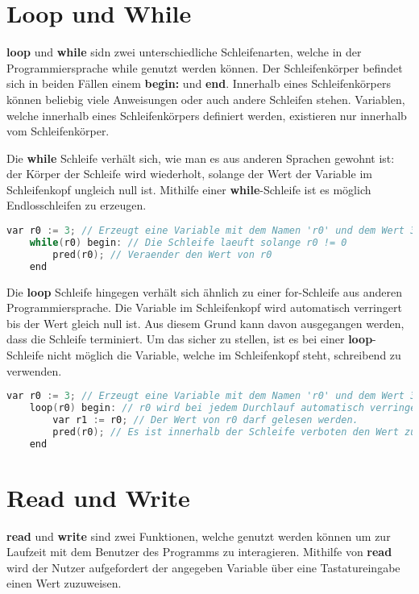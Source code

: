 \section{Loop und While}
\textbf{loop} und \textbf{while} sidn zwei unterschiedliche Schleifenarten, welche in der Programmiersprache while genutzt werden können. Der Schleifenkörper befindet sich in beiden Fällen einem \textbf{begin:} und \textbf{end}. Innerhalb eines Schleifenkörpers können beliebig viele Anweisungen oder auch andere Schleifen stehen. Variablen, welche innerhalb eines Schleifenkörpers definiert werden, existieren nur innerhalb vom Schleifenkörper.

Die \textbf{while} Schleife verhält sich, wie man es aus anderen Sprachen gewohnt ist: der Körper der Schleife wird wiederholt, solange der Wert der Variable im Schleifenkopf ungleich null ist. Mithilfe einer \textbf{while}-Schleife ist es möglich Endlosschleifen zu erzeugen.

\begin{lstlisting}[language=c, caption=while-Schleife in While, label={lst:while-var-defdec}]
	var r0 := 3; // Erzeugt eine Variable mit dem Namen 'r0' und dem Wert 3
	while(r0) begin: // Die Schleife laeuft solange r0 != 0
		pred(r0); // Veraender den Wert von r0
	end
\end{lstlisting}

Die \textbf{loop} Schleife hingegen verhält sich ähnlich zu einer for-Schleife aus anderen Programmiersprache. Die Variable im Schleifenkopf wird automatisch verringert bis der Wert gleich null ist. Aus diesem Grund kann davon ausgegangen werden, dass die Schleife terminiert. Um das sicher zu stellen, ist es bei einer \textbf{loop}-Schleife nicht möglich die Variable, welche im Schleifenkopf steht, schreibend zu verwenden. 

\begin{lstlisting}[language=c, caption=loop-Schleife in While, label={lst:while-var-defdec}]
	var r0 := 3; // Erzeugt eine Variable mit dem Namen 'r0' und dem Wert 3
	loop(r0) begin: // r0 wird bei jedem Durchlauf automatisch verringert
		var r1 := r0; // Der Wert von r0 darf gelesen werden.
		pred(r0); // Es ist innerhalb der Schleife verboten den Wert zu aendern!
	end
\end{lstlisting}

\section{Read und Write}
\textbf{read} und \textbf{write} sind zwei Funktionen, welche genutzt werden können um zur Laufzeit mit dem Benutzer des Programms zu interagieren. Mithilfe von \textbf{read} wird der Nutzer aufgefordert der angegeben Variable über eine Tastatureingabe einen Wert zuzuweisen. 

